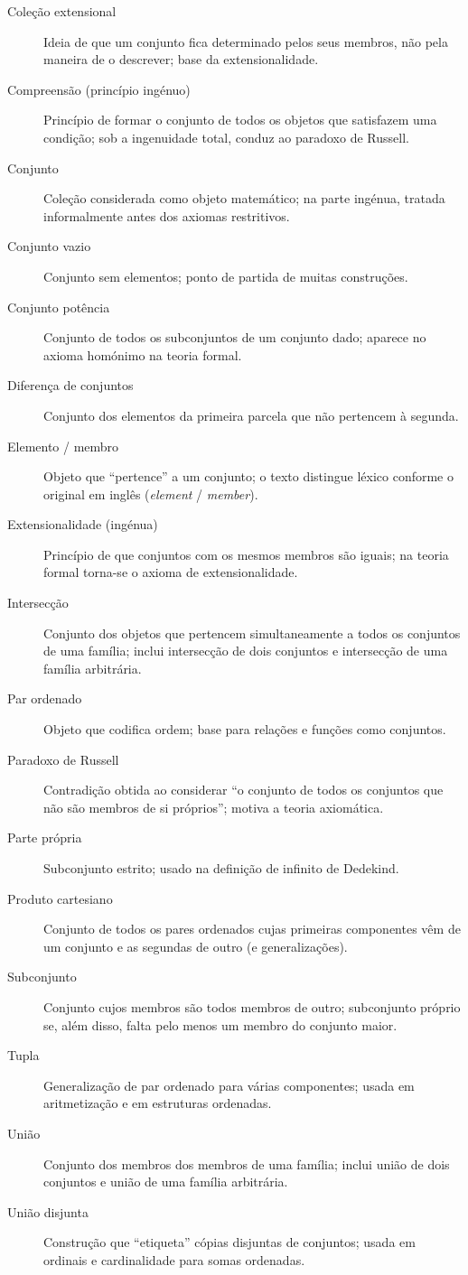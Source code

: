 \begin{description}
\item[Coleção extensional] Ideia de que um conjunto fica determinado pelos seus membros, não pela maneira de o descrever; base da extensionalidade.
\item[Compreensão (princípio ingénuo)] Princípio de formar o conjunto de todos os objetos que satisfazem uma condição; sob a ingenuidade total, conduz ao paradoxo de Russell.
\item[Conjunto] Coleção considerada como objeto matemático; na parte ingénua, tratada informalmente antes dos axiomas restritivos.
\item[Conjunto vazio] Conjunto sem elementos; ponto de partida de muitas construções.
\item[Conjunto potência] Conjunto de todos os subconjuntos de um conjunto dado; aparece no axioma homónimo na teoria formal.
\item[Diferença de conjuntos] Conjunto dos elementos da primeira parcela que não pertencem à segunda.
\item[Elemento / membro] Objeto que ``pertence'' a um conjunto; o texto distingue léxico conforme o original em inglês (\textit{element} / \textit{member}).
\item[Extensionalidade (ingénua)] Princípio de que conjuntos com os mesmos membros são iguais; na teoria formal torna-se o axioma de extensionalidade.
\item[Intersecção] Conjunto dos objetos que pertencem simultaneamente a todos os conjuntos de uma família; inclui intersecção de dois conjuntos e intersecção de uma família arbitrária.
\item[Par ordenado] Objeto que codifica ordem; base para relações e funções como conjuntos.
\item[Paradoxo de Russell] Contradição obtida ao considerar ``o conjunto de todos os conjuntos que não são membros de si próprios''; motiva a teoria axiomática.
\item[Parte própria] Subconjunto estrito; usado na definição de infinito de Dedekind.
\item[Produto cartesiano] Conjunto de todos os pares ordenados cujas primeiras componentes vêm de um conjunto e as segundas de outro (e generalizações).
\item[Subconjunto] Conjunto cujos membros são todos membros de outro; subconjunto próprio se, além disso, falta pelo menos um membro do conjunto maior.
\item[Tupla] Generalização de par ordenado para várias componentes; usada em aritmetização e em estruturas ordenadas.
\item[União] Conjunto dos membros dos membros de uma família; inclui união de dois conjuntos e união de uma família arbitrária.
\item[União disjunta] Construção que ``etiqueta'' cópias disjuntas de conjuntos; usada em ordinais e cardinalidade para somas ordenadas.
\end{description}

